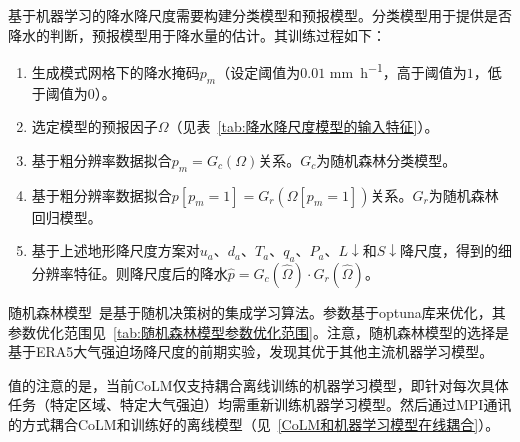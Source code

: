 基于机器学习的降水降尺度需要构建分类模型和预报模型。分类模型用于提供是否降水的判断，预报模型用于降水量的估计。其训练过程如下：

\begin{enumerate}
    \item 生成模式网格下的降水掩码$p_{m}$（设定阈值为$0.01$ \unit{mm.h^{-1}}，高于阈值为$1$，低于阈值为$0$）。
    \item 选定模型的预报因子$\Omega$（见表~\ref{tab:降水降尺度模型的输入特征}）。
    \item 基于粗分辨率数据拟合$p_{m}=G_{c}\left(\Omega\right)$关系。$G_{c}$为随机森林分类模型。
    \item 基于粗分辨率数据拟合$p[p_{m}=1]=G_{r}\left(\Omega[p_{m}=1]\right)$关系。$G_{r}$为随机森林回归模型。
    \item 基于上述地形降尺度方案对$u_{a}$、$d_{a}$、$T_{a}$、$q_{a}$、$P_{a}$、$L\downarrow$和$S\downarrow$降尺度，得到的细分辨率特征。则降尺度后的降水$\hat{p}=G_{c}\left(\hat{\Omega}\right) \cdot G_{r}\left(\hat{\Omega}\right)$。
\end{enumerate}

随机森林模型~\citep{rf2001}是基于随机决策树的集成学习算法。参数基于optuna库来优化，其参数优化范围见~\ref{tab:随机森林模型参数优化范围}。注意，随机森林模型的选择是基于ERA5大气强迫场降尺度的前期实验，发现其优于其他主流机器学习模型。

值的注意的是，当前CoLM仅支持耦合离线训练的机器学习模型，即针对每次具体任务（特定区域、特定大气强迫）均需重新训练机器学习模型。然后通过MPI通讯的方式耦合CoLM和训练好的离线模型（见~\ref{CoLM和机器学习模型在线耦合}）。

